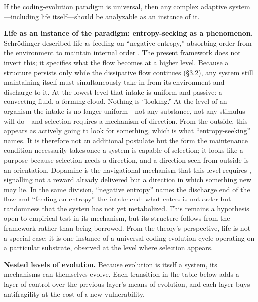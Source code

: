 \documentclass[11pt,a4paper]{article}
\begin{document}
If the coding-evolution paradigm is universal, then any complex adaptive system---including life itself---should be analyzable as an instance of it.

\textbf{Life as an instance of the paradigm: entropy-seeking as a phenomenon.} Schrödinger described life as feeding on ``negative entropy,'' absorbing order from the environment to maintain internal order \citep{schrodinger1944}. The present framework does not invert this; it specifies what the flow becomes at a higher level. Because a structure persists only while the dissipative flow continues (\S3.2), any system still maintaining itself must simultaneously take in from its environment and discharge to it. At the lowest level that intake is uniform and passive: a convecting fluid, a forming cloud. Nothing is ``looking.'' At the level of an organism the intake is no longer uniform---not any substance, not any stimulus will do---and selection requires a mechanism of direction. From the outside, this appears as actively going to look for something, which is what ``entropy-seeking'' names. It is therefore not an additional postulate but the form the maintenance condition necessarily takes once a system is capable of selection; it looks like a purpose because selection needs a direction, and a direction seen from outside is an orientation. Dopamine is the navigational mechanism that this level requires \citep{schultz1998}, signalling not a reward already delivered but a direction in which something new may lie. In the same division, ``negative entropy'' names the discharge end of the flow and ``feeding on entropy'' the intake end: what enters is not order but randomness that the system has not yet metabolized. This remains a hypothesis open to empirical test in its mechanism, but its structure follows from the framework rather than being borrowed. From the theory's perspective, life is not a special case; it is one instance of a universal coding-evolution cycle operating on a particular substrate, observed at the level where selection appears.

\textbf{Nested levels of evolution.} Because evolution is itself a system, its mechanisms can themselves evolve. Each transition in the table below adds a layer of control over the previous layer's means of evolution, and each layer buys antifragility at the cost of a new vulnerability.
\end{document}
